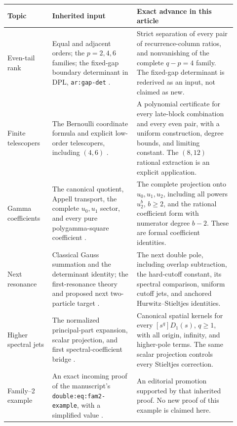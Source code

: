 \documentclass[11pt,letterpaper]{article}
\numberwithin{equation}{section}
\theoremstyle{plain}
\theoremstyle{definition}
\theoremstyle{remark}
\begin{document}
\begin{center}
\small
\begin{tabular}{@{}>{\raggedright\arraybackslash}p{0.18\linewidth}>{\raggedright\arraybackslash}p{0.34\linewidth}>{\raggedright\arraybackslash}p{0.40\linewidth}@{}}
\hline
Topic & Inherited input & Exact advance in this article\\
\hline
Even-tail rank & Equal and adjacent orders; the $p=2,4,6$ families;
the fixed-gap boundary determinant in DPL,
\texttt{ar:gap-det} \cite{DPL,PTI,BTD}.
& Strict separation of every pair of recurrence-column ratios, and
nonvanishing of the complete $q-p=4$ family. The fixed-gap determinant
is rederived as an input, not claimed as new.\\[4pt]
Finite telescopers & The Bernoulli coordinate formula and explicit
low-order telescopers, including $(4,6)$ \cite{DPL}.
& A polynomial certificate for every late-block combination and every
even pair, with a uniform construction, degree bounds, and limiting
constant. The $(8,12)$ rational extraction is an explicit application.\\[4pt]
Gamma coefficients & The canonical quotient, Appell transport, the
complete $u_0,u_1$ sector, and every pure polygamma-square coefficient
\cite{DPL,PTI,BTD}.
& The complete projection onto $u_0,u_1,u_2$, including all powers
$u_2^b$, $b\ge2$, and the rational coefficient form with numerator
degree $b-2$. These are formal coefficient identities.\\[4pt]
Next resonance & Classical Gauss summation and the determinant
identity; the first-resonance theory and proposed next two-particle
target \cite{DHR}.
& The next double pole, including overlap subtraction, the hard-cutoff
constant, its spectral comparison, uniform cutoff jets, and anchored
Hurwitz--Stieltjes identities.\\[4pt]
Higher spectral jets & The normalized principal-part expansion,
scalar projection, and first spectral-coefficient bridge \cite{DPL}.
& Canonical spatial kernels for every $[s^q]D_1(s)$, $q\ge1$, with
all origin, infinity, and higher-pole terms. The same scalar projection
controls every Stieltjes correction.\\[4pt]
Family--2 example & An exact incoming proof of the manuscript's
\texttt{double:eq:fam2-example}, with a simplified value \cite{PTI}.
& An editorial promotion supported by that inherited proof. No new
proof of this example is claimed here.\\
\hline
\end{tabular}
\end{center}
\end{document}
